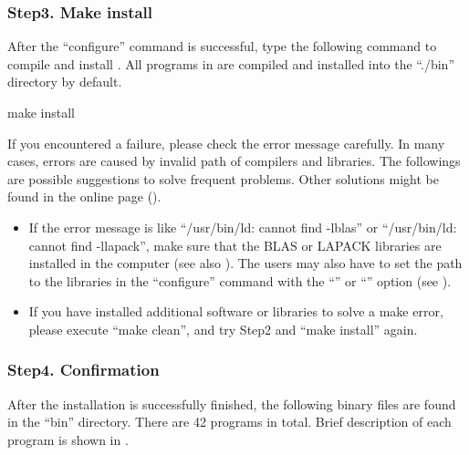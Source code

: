 \documentclass[a4paper,11pt,oneside,english]{sphinxmanual}
\begin{document}
\subsubsection{Step3. Make install}
\label{\detokenize{01_Getting_Started:step3-make-install}}
After the “configure” command is successful, type the following command to compile and install .
All programs in  are compiled and installed into the “./bin” directory by default.

\begin{sphinxVerbatim}[commandchars=\\\{\}]
\PYGZdl{} make install
\end{sphinxVerbatim}

If you encountered a failure, please check the error message carefully.
In many cases, errors are caused by invalid path of compilers and libraries.
The followings are possible suggestions to solve frequent problems.
Other solutions might be found in the online page
().
\begin{itemize}
\item {} 
If the error message is like “/usr/bin/ld: cannot find -lblas” or “/usr/bin/ld: cannot find -llapack”,
make sure that the BLAS or LAPACK libraries are installed in the computer (see also {\hyperref[\detokenize{98_Appendix:appendix}]{}}).
The users may also have to set the path to the libraries in the “configure” command
with the “” or “” option (see {\hyperref[\detokenize{01_Getting_Started:advanced-installation}]{}}).

\item {} 
If you have installed additional software or libraries to solve a make error,
please execute “make clean”, and try Step2 and “make install” again.

\end{itemize}


\subsubsection{Step4. Confirmation}
\label{\detokenize{01_Getting_Started:step4-confirmation}}
After the installation is successfully finished, the following binary files are found in the “bin” directory.
There are 42 programs in total. Brief description of each program is shown in {\hyperref[\detokenize{02_Available_Programs:available-programs}]{}}.
\end{document}
